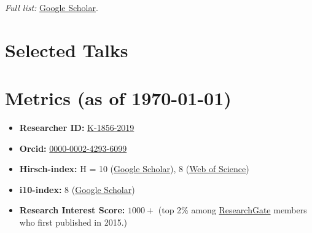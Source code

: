 \documentclass[10pt,a4paper,colorlinks,linkcolor=blue,urlcolor=blue]{moderncv}
\begin{document}
\textit{Full list:} \href{https://scholar.google.com/citations?user=tHb_qZoAAAAJ&hl=en}{Google Scholar}.

\section{Selected Talks}

\section{Metrics (as of \today)}
\begin{itemize}[leftmargin=1.5em]
\item \faIdCard\hspace{0.3em}\textbf{Researcher ID:} \href{https://www.webofscience.com/wos/author/record/K-1856-2019}{K-1856-2019}
\item \faOrcid\hspace{0.3em}\textbf{Orcid:} \href{https://orcid.org/0000-0002-4293-6099}{0000-0002-4293-6099}
\item \faChartLine\hspace{0.3em}\textbf{Hirsch-index:} H = 10 (\href{https://scholar.google.com/citations?hl=en&user=tHb_qZoAAAAJ}{Google Scholar}), 8 (\href{https://www.webofscience.com/wos/author/record/K-1856-2019}{Web of Science})
\item \faFile\hspace{0.3em}\textbf{i10-index:} 8 (\href{https://scholar.google.com/citations?hl=en&user=tHb_qZoAAAAJ}{Google Scholar})
\item \faUsers\hspace{0.3em}\textbf{Research Interest Score:} $1000+$ (top 2\% among \href{https://www.researchgate.net/profile/Vatsal-Sanjay-2}{ResearchGate} members who first published in 2015.)
\end{itemize}
\end{document}
